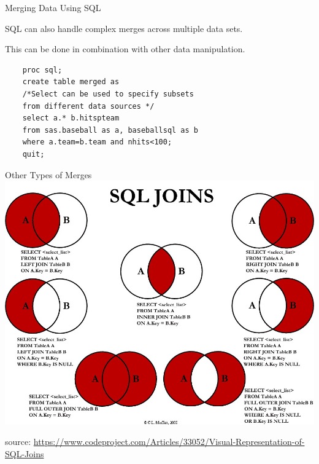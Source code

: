 \documentclass{beamer}
\begin{document}
\begin{frame}[fragile]{Merging Data Using SQL}
\item SQL can also handle complex merges across multiple data sets.
\item This can be done in combination with other data manipulation.
\begin{verbatim}
    proc sql;
    create table merged as
    /*Select can be used to specify subsets
    from different data sources */
    select a.* b.hitspteam 
    from sas.baseball as a, baseballsql as b
    where a.team=b.team and nhits<100;
    quit;
\end{verbatim}
\end{frame}

\begin{frame}{Other Types of Merges}
\includegraphics[width=.8\linewidth]{SQL_joins.jpg}
\begin{tiny}
\linebreak
source: \url{https://www.codeproject.com/Articles/33052/Visual-Representation-of-SQL-Joins}
\end{tiny}
\end{frame}
\end{document}
